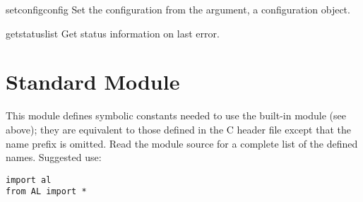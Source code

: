 \begin{funcdesc}{setconfig}{config}
Set the configuration from the argument, a configuration object.
\end{funcdesc}

\begin{funcdesc}{getstatus}{list}
Get status information on last error.
\end{funcdesc}

\section{Standard Module }

This module defines symbolic constants needed to use the built-in
module  (see above); they are equivalent to those defined in
the C header file  except that the name prefix
 is omitted.  Read the module source for a complete list of
the defined names.  Suggested use:

\begin{verbatim}
import al
from AL import *
\end{verbatim}
